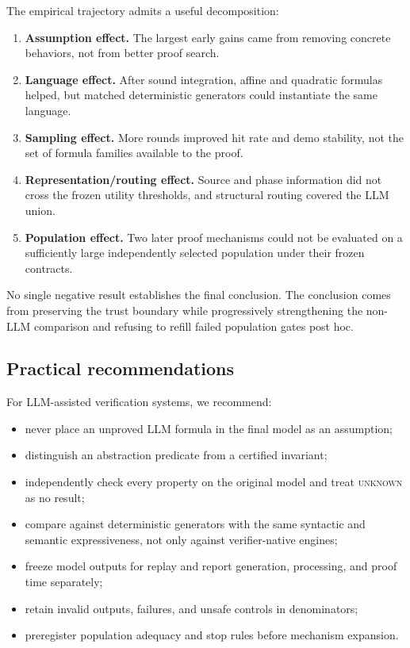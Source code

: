 \documentclass[10pt]{article}
\newcommand{\unknown}{\textsc{unknown}}
\begin{document}
The empirical trajectory admits a useful decomposition:
\begin{enumerate}
  \item \textbf{Assumption effect.}  The largest early gains came from removing
        concrete behaviors, not from better proof search.
  \item \textbf{Language effect.}  After sound integration, affine and
        quadratic formulas helped, but matched deterministic generators could
        instantiate the same language.
  \item \textbf{Sampling effect.}  More rounds improved hit rate and demo
        stability, not the set of formula families available to the proof.
  \item \textbf{Representation/routing effect.}  Source and phase information
        did not cross the frozen utility thresholds, and structural routing
        covered the LLM union.
  \item \textbf{Population effect.}  Two later proof mechanisms could not be
        evaluated on a sufficiently large independently selected population
        under their frozen contracts.
\end{enumerate}

No single negative result establishes the final conclusion.  The conclusion
comes from preserving the trust boundary while progressively strengthening the
non-LLM comparison and refusing to refill failed population gates post hoc.

\subsection{Practical recommendations}

For LLM-assisted verification systems, we recommend:
\begin{itemize}
  \item never place an unproved LLM formula in the final model as an assumption;
  \item distinguish an abstraction predicate from a certified invariant;
  \item independently check every property on the original model and treat
        \unknown{} as no result;
  \item compare against deterministic generators with the same syntactic and
        semantic expressiveness, not only against verifier-native engines;
  \item freeze model outputs for replay and report generation, processing, and
        proof time separately;
  \item retain invalid outputs, failures, and unsafe controls in denominators;
  \item preregister population adequacy and stop rules before mechanism
        expansion.
\end{itemize}
\end{document}
